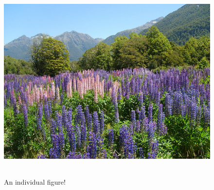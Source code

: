 \documentclass[../../main.tex]{subfiles}  %
\begin{document}
	\begin{figure}[hb] %
		\centering
		\includegraphics[height =4in]{./Plots/nature.jpg} 
		\caption{An individual figure!}
	\end{figure}
			
\end{document}
